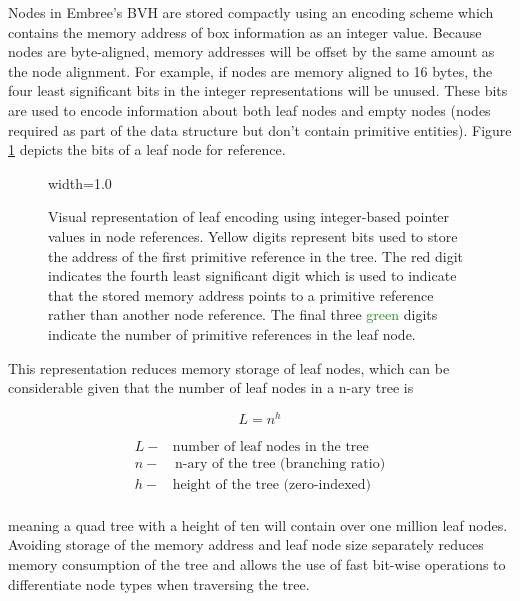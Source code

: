 Nodes in Embree's BVH are stored compactly using an encoding scheme which contains
the memory address of box information as an integer value. Because nodes are
byte-aligned, memory addresses will be offset by the same amount as the node
alignment. For example, if nodes are memory aligned to 16 bytes, the four least
significant bits in the integer representations will be unused. These bits are
used to encode information about both leaf nodes and empty nodes (nodes
required as part of the data structure but don't contain primitive entities). Figure
\ref{fig:node_encoding} depicts the bits of a leaf node for reference.

\begin{figure}[H]
  \centering
  {width=1.0\textwidth}
  \caption[Graphic of leaf node encoding.]{Visual representation of leaf
    encoding using integer-based pointer values in node references. \textcolor{Dandelion}{Yellow}
    digits represent bits used to store the address of the first primitive
    reference in the tree. The \textcolor{BrickRed}{red} digit indicates the fourth least significant
    digit which is used to indicate that the stored memory address points to a
    primitive reference rather than another node reference. The final three
    \textcolor{ForestGreen}{green} digits indicate the number of primitive references in the leaf node.}
  \label{fig:node_encoding}
\end{figure}

This representation reduces memory storage of leaf nodes, which can be
considerable given that the number of leaf nodes in a n-ary tree is

\begin{equation}
 L = n^{h} 
\end{equation}

\begin{align*}
   L - & \textrm{number of leaf nodes in the tree} \\
   n - & \, \textrm{n-ary  of  the  tree  (branching  ratio)} \\
   h - &  \textrm{height  of  the  tree  (zero-indexed)} \\
\end{align*}

meaning a quad tree with a height of ten will contain over one million leaf
nodes. Avoiding storage of the memory address and leaf node size separately
reduces memory consumption of the tree and allows the use of fast bit-wise
operations to differentiate node types when traversing the tree. 

